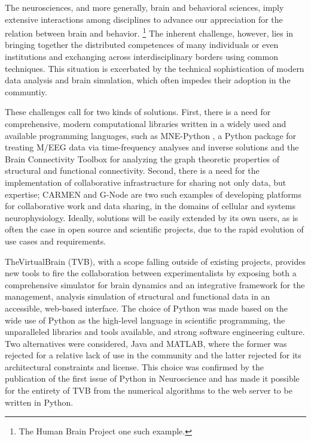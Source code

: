 The neurosciences, and more generally, brain and behavioral sciences, imply
extensive interactions among disciplines to advance our 
appreciation for the relation between brain and behavior. 
\footnote{The Human Brain Project one such example.} 
The inherent challenge, however, lies in bringing together the distributed competences
of many individuals or even institutions and exchanging across interdisciplinary
borders using common techniques.  
This situation is excerbated by the technical sophistication of modern
data analysis and brain simulation, which often impedes their adoption 
in the communtiy.

These challenges call for two kinds of solutions. First, there is a need
for comprehensive, modern computational libraries written in a widely
used and available programming languages, such as MNE-Python \citep{mnepython},
a Python package for treating M/EEG data via time-frequency analyses and inverse
solutions and the Brain Connectivity
Toolbox \citep{rubinov2010complex} for analyzing the graph theoretic
properties of structural and functional connectivity. Second, there is
a need for the implementation
of collaborative infrastructure for sharing not only data, but expertise; 
CARMEN \citep{austin2011carmen} and G-Node \citep{herz2008g} are two such
examples of developing platforms for collaborative work and data sharing, 
in the domains of cellular and systems neurophysiology.
Ideally, solutions will be easily extended by its own users, as is often
the case in open source and scientific projects, due to the rapid 
evolution of use cases and requirements.

TheVirtualBrain (TVB), with a scope falling outside of existing projects,
provides new tools to fire the collaboration between experimentalists by
exposing both a comprehensive simulator for brain dynamics and an integrative 
framework for the management, analysis simulation of structural and functional
data in an accessible, web-based interface. The choice of Python was made based on
the wide use of Python as the high-level language in scientific programming, 
the unparalleled libraries and tools available, and strong software engineering 
culture.
Two alternatives were considered, Java
and MATLAB, where the former was rejected for a relative lack of use in the community
and the latter rejected for its architectural constraints and license. 
This choice was confirmed by the publication of the first issue of Python 
in Neuroscience and has made it possible for the entirety of TVB from the 
numerical algorithms to the web server to be written in Python.

